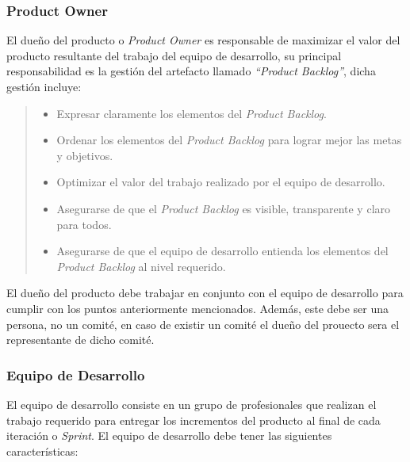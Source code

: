\subsubsection{Product Owner}

 \noindent El dueño del producto o {\em Product Owner} es responsable de maximizar el valor
 del producto resultante del trabajo del equipo de desarrollo, su principal responsabilidad
 es la gestión del artefacto llamado {\em``Product Backlog''}, dicha gestión incluye:

    \begin{quote}
    \begin{itemize}
        \item Expresar claramente los elementos del {\it Product Backlog}.
        \item Ordenar los elementos del {\it Product Backlog} para lograr mejor las metas y
               objetivos.
        \item Optimizar el valor del trabajo realizado por el equipo de desarrollo.
        \item Asegurarse de que el {\it Product Backlog} es visible, transparente y claro para todos.
        \item Asegurarse de que el equipo de desarrollo entienda los elementos del {\it Product
               Backlog} al nivel requerido.\\
    \end{itemize}
    \end{quote}

 \noindent El dueño del producto debe trabajar en conjunto con el equipo de desarrollo para
 cumplir con los puntos anteriormente mencionados. Además, este debe ser una persona, no un comité,
 en caso de existir un comité el dueño del prouecto sera el representante de dicho comité.

\subsubsection{Equipo de Desarrollo}

 El equipo de desarrollo consiste en un grupo de profesionales que realizan el trabajo requerido
 para entregar los incrementos del producto al final de cada iteración o {\it Sprint}. El equipo
 de desarrollo debe tener las siguientes características:

